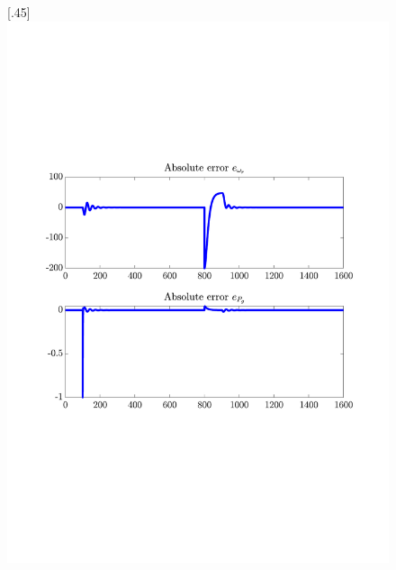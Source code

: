 \begin{figure}[H]
    [.45\textwidth]{\includegraphics[width=1\linewidth, scale=1, trim=60 230 55 150,clip]{fig/Open_loop/exp_2_error.pdf}}
%

\end{figure}

